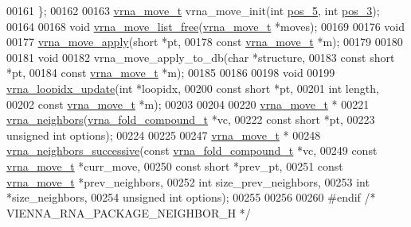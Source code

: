 \begin{DoxyCode}
00161 \};
00162 
00163 \hyperlink{group__neighbors_structvrna__move__s}{vrna\_move\_t} vrna\_move\_init(\textcolor{keywordtype}{int} \hyperlink{group__neighbors_a8af908c74786675a456d0f20cc8fcb9b}{pos\_5}, \textcolor{keywordtype}{int} \hyperlink{group__neighbors_a3849db905a45c4e399991df38705a36b}{pos\_3});
00164 
00168 \textcolor{keywordtype}{void} \hyperlink{group__neighbors_gad085062ae3aa7ee20783debe4a906fad}{vrna\_move\_list\_free}(\hyperlink{group__neighbors_structvrna__move__s}{vrna\_move\_t} *moves);
00169 
00176 \textcolor{keywordtype}{void}
00177 \hyperlink{group__neighbors_gacdbc5f609b46aeb07d2c7e015677a1e0}{vrna\_move\_apply}(\textcolor{keywordtype}{short}             *pt,
00178                 \textcolor{keyword}{const} \hyperlink{group__neighbors_structvrna__move__s}{vrna\_move\_t} *m);
00179 
00180 
00181 \textcolor{keywordtype}{void}
00182 vrna\_move\_apply\_to\_db(\textcolor{keywordtype}{char}              *structure,
00183                       \textcolor{keyword}{const} \textcolor{keywordtype}{short}       *pt,
00184                       \textcolor{keyword}{const} \hyperlink{group__neighbors_structvrna__move__s}{vrna\_move\_t} *m);
00185 
00186 
00198 \textcolor{keywordtype}{void}
00199 \hyperlink{group__neighbors_ga5ceb55ee56494b1f5b7aaa758cb722d1}{vrna\_loopidx\_update}(\textcolor{keywordtype}{int}               *loopidx,
00200                     \textcolor{keyword}{const} \textcolor{keywordtype}{short}       *pt,
00201                     \textcolor{keywordtype}{int}               length,
00202                     \textcolor{keyword}{const} \hyperlink{group__neighbors_structvrna__move__s}{vrna\_move\_t} *m);
00203 
00204 
00220 \hyperlink{group__neighbors_structvrna__move__s}{vrna\_move\_t} *
00221 \hyperlink{group__neighbors_gab1473d856b15da2120fe648977798ad5}{vrna\_neighbors}(\hyperlink{group__fold__compound_structvrna__fc__s}{vrna\_fold\_compound\_t} *vc,
00222                \textcolor{keyword}{const} \textcolor{keywordtype}{short}          *pt,
00223                \textcolor{keywordtype}{unsigned} \textcolor{keywordtype}{int}         options);
00224 
00225 
00247 \hyperlink{group__neighbors_structvrna__move__s}{vrna\_move\_t} *
00248 \hyperlink{group__neighbors_gae5aaa1c5a1f22e889843f3edbdd04714}{vrna\_neighbors\_successive}(\textcolor{keyword}{const} \hyperlink{group__fold__compound_structvrna__fc__s}{vrna\_fold\_compound\_t}  *vc,
00249                           \textcolor{keyword}{const} \hyperlink{group__neighbors_structvrna__move__s}{vrna\_move\_t}           *curr\_move,
00250                           \textcolor{keyword}{const} \textcolor{keywordtype}{short}                 *prev\_pt,
00251                           \textcolor{keyword}{const} \hyperlink{group__neighbors_structvrna__move__s}{vrna\_move\_t}           *prev\_neighbors,
00252                           \textcolor{keywordtype}{int}                         size\_prev\_neighbors,
00253                           \textcolor{keywordtype}{int}                         *size\_neighbors,
00254                           \textcolor{keywordtype}{unsigned} \textcolor{keywordtype}{int}                options);
00255 
00256 
00260 \textcolor{preprocessor}{#endif }\textcolor{comment}{/* VIENNA\_RNA\_PACKAGE\_NEIGHBOR\_H */}\textcolor{preprocessor}{}
\end{DoxyCode}

